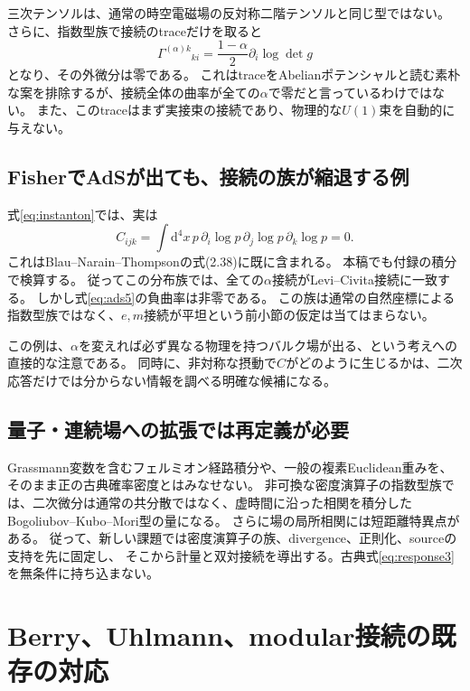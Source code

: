 \documentclass[a4paper,11pt]{ltjsarticle}
\numberwithin{equation}{section}
\newcommand{\dd}{\mathrm d}
\begin{document}
三次テンソルは、通常の時空電磁場の反対称二階テンソルと同じ型ではない。
さらに、指数型族で接続のtraceだけを取ると
\begin{equation}
 \Gamma^{(\alpha)k}{}_{ki}
 =\frac{1-\alpha}{2}\partial_i\log\det g
 \label{eq:trace}
\end{equation}
となり、その外微分は零である。
これはtraceをAbelianポテンシャルと読む素朴な案を排除するが、接続全体の曲率が全ての$\alpha$で零だと言っているわけではない。
また、このtraceはまず実接束の接続であり、物理的な$U(1)$束を自動的に与えない。

\subsection{FisherでAdSが出ても、接続の族が縮退する例}
式\eqref{eq:instanton}では、実は
\begin{equation}
 C_{ijk}=\int\dd^4x\,p\,\partial_i\log p\,\partial_j\log p\,\partial_k\log p=0.
 \label{eq:instcubic}
\end{equation}
これはBlau--Narain--Thompsonの式(2.38)に既に含まれる\cite{BNT}。
本稿でも付録の積分で検算する。
従ってこの分布族では、全ての$\alpha$接続がLevi--Civita接続に一致する。
しかし式\eqref{eq:ads5}の負曲率は非零である。
この族は通常の自然座標による指数型族ではなく、$e,m$接続が平坦という前小節の仮定は当てはまらない。

この例は、$\alpha$を変えれば必ず異なる物理を持つバルク場が出る、という考えへの直接的な注意である。
同時に、非対称な摂動で$C$がどのように生じるかは、二次応答だけでは分からない情報を調べる明確な候補になる。

\subsection{量子・連続場への拡張では再定義が必要}
Grassmann変数を含むフェルミオン経路積分や、一般の複素Euclidean重みを、そのまま正の古典確率密度とはみなせない。
非可換な密度演算子の指数型族では、二次微分は通常の共分散ではなく、虚時間に沿った相関を積分したBogoliubov--Kubo--Mori型の量になる。
さらに場の局所相関には短距離特異点がある。
従って、新しい課題では密度演算子の族、divergence、正則化、sourceの支持を先に固定し、
そこから計量と双対接続を導出する。古典式\eqref{eq:response3}を無条件に持ち込まない。

\section{Berry、Uhlmann、modular接続の既存の対応}
\end{document}
